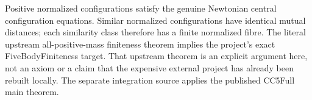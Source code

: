 \begin{theorem}
\label{bp:upstream-adapter}
\leanok
Positive normalized configurations satisfy the genuine Newtonian central
configuration equations. Similar normalized configurations have identical
mutual distances; each similarity class therefore has a finite normalized
fibre. The literal upstream all-positive-mass finiteness theorem implies the
project's exact FiveBodyFiniteness target. That upstream theorem is an explicit
argument here, not an axiom or a claim that the expensive external project
has already been rebuilt locally. The separate integration source applies
the published CC5Full main theorem.
\end{theorem}
